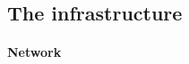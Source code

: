 



\subsection{The infrastructure}
\label{sub:impl_infrastructure}



\paragraph{Network}
\label{par:impl_infra_network}


